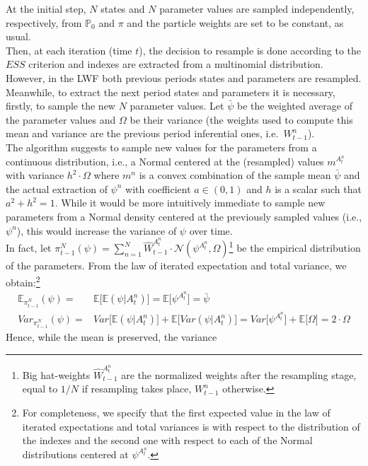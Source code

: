 \documentclass[
]{book}
\theoremstyle{break}
\theoremstyle{nonumberplain}
\begin{document}
At the initial step, \(N\) states and \(N\) parameter values are sampled
independently, respectively, from \(\mathbb P_0\) and \(\pi\) and the
particle weights are set to be constant, as usual.\\
Then, at each iteration (time \(t\)), the decision to resample is done
according to the \(ESS\) criterion and indexes are extracted from a
multinomial distribution. However, in the LWF both previous periods
states and parameters are resampled.\\
Meanwhile, to extract the next period states and parameters it is
necessary, firstly, to sample the new \(N\) parameter values. Let
\(\bar \psi\) be the weighted average of the parameter values and
\(\Omega\) be their variance (the weights used to compute this mean and
variance are the previous period inferential ones,
i.e.~\(W_{t-1}^n\)).~\\
The algorithm suggests to sample new values for the parameters from a
continuous distribution, i.e., a Normal centered at the (resampled)
values \(m^{A_t^n}\) with variance \(h^2\cdot \Omega\) where \(m^n\) is
a convex combination of the sample mean \(\bar\psi\) and the actual
extraction of \(\psi^n\) with coefficient \(a\in (0,1)\) and \(h\) is a
scalar such that \(a^2+h^2=1\). While it would be more intuitively
immediate to sample new parameters from a Normal density centered at the
previously sampled values (i.e., \(\psi^n\)), this would increase the
variance of \(\psi\) over time.\\
In fact, let
\(\pi_{t-1}^N(\psi)=\sum_{n=1}^N \hat W_{t-1}^{A_t^{n}}\cdot \mathcal N(\psi^{A_t^{n}},\Omega)\)\footnote{Big hat-weights $ \hat W_{t-1}^{A_t^{n}}$ are the normalized weights after the resampling stage, equal to $1/N$ if resampling takes place, $W_{t-1}^n$ otherwise.}
be the empirical distribution of the parameters. From the law of
iterated expectation and total variance, we
obtain:\footnote{For completeness, we specify that the first expected value in the law of iterated expectations and total variances is with respect to the distribution of the indexes and the second one with respect to each of the Normal distributions centered at $\psi^{A_t^{n}}$.}
\begin{equation*}
    \begin{split}
        \mathbb E_{\pi_{t-1}^N} ( \psi)=& \mathbb E\big[\mathbb E( \psi|A_t^{n})\big]=\mathbb E\big[\psi^{A_t^{n}}\big]=\bar \psi\\
        Var_{\pi_{t-1}^N} ( \psi)=&Var\big[\mathbb E( \psi|A_t^{n})\big]+\mathbb E\big[Var( \psi|A_t^{n})\big]=Var\big[\psi^{A_t^{n}}\big]+\mathbb E\big[\Omega\big]=2\cdot\Omega
    \end{split}
\end{equation*} Hence, while the mean is preserved, the variance
\end{document}

